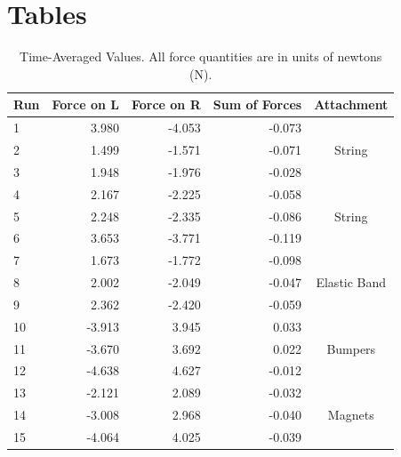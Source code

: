 \section{Tables}
\begin{table}[ht]
    \centering
    \begin{tabular}{|l|r|r|r|c|}
        \hline
        \textbf{Run} & \textbf{Force on L} & \textbf{Force on R} & \textbf{Sum of Forces} & \textbf{Attachment} \\
        \hline
        1 & 3.980 & -4.053 & -0.073 & \\
        2 & 1.499 & -1.571 & -0.071 & String \\
        3 & 1.948 & -1.976 & -0.028 & \\
        \hline
        4 & 2.167 & -2.225 & -0.058 & \\
        5 & 2.248 & -2.335 & -0.086 & String \\
        6 & 3.653 & -3.771 & -0.119 & \\
        \hline
        7 & 1.673 & -1.772 & -0.098 & \\
        8 & 2.002 & -2.049 & -0.047 & Elastic Band \\
        9 & 2.362 & -2.420 & -0.059 & \\
        \hline
        10 & -3.913 & 3.945 & 0.033 & \\
        11 & -3.670 & 3.692 & 0.022 & Bumpers \\
        12 & -4.638 & 4.627 & -0.012 & \\
        \hline
        13 & -2.121 & 2.089 & -0.032 & \\
        14 & -3.008 & 2.968 & -0.040 & Magnets \\
        15 & -4.064 & 4.025 & -0.039 & \\
        \hline
    \end{tabular}
    \caption{Time-Averaged Values. All force quantities are in units of newtons (N).}
    \label{table:05.results}
\end{table}
\FloatBarrier
\newpage
